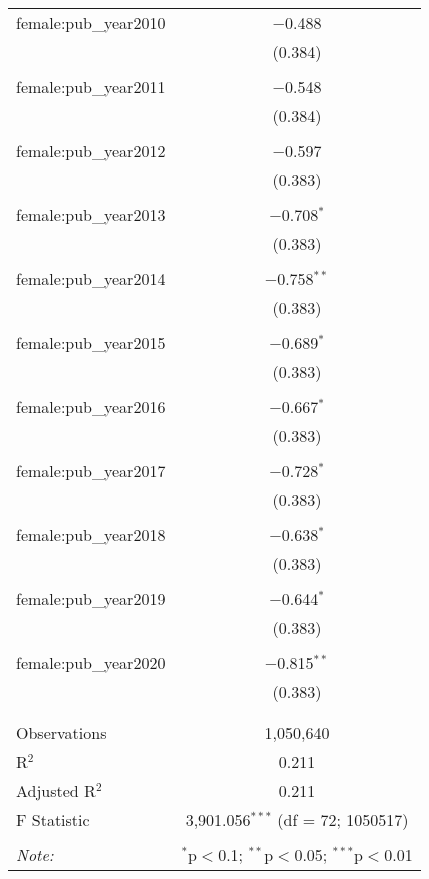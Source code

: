 \begin{table}[!htbp]
\begin{tabular}{@{\extracolsep{5pt}}lc}
 female:pub\_year2010 & $-$0.488 \\ 
  & (0.384) \\ 
  & \\ 
 female:pub\_year2011 & $-$0.548 \\ 
  & (0.384) \\ 
  & \\ 
 female:pub\_year2012 & $-$0.597 \\ 
  & (0.383) \\ 
  & \\ 
 female:pub\_year2013 & $-$0.708$^{*}$ \\ 
  & (0.383) \\ 
  & \\ 
 female:pub\_year2014 & $-$0.758$^{**}$ \\ 
  & (0.383) \\ 
  & \\ 
 female:pub\_year2015 & $-$0.689$^{*}$ \\ 
  & (0.383) \\ 
  & \\ 
 female:pub\_year2016 & $-$0.667$^{*}$ \\ 
  & (0.383) \\ 
  & \\ 
 female:pub\_year2017 & $-$0.728$^{*}$ \\ 
  & (0.383) \\ 
  & \\ 
 female:pub\_year2018 & $-$0.638$^{*}$ \\ 
  & (0.383) \\ 
  & \\ 
 female:pub\_year2019 & $-$0.644$^{*}$ \\ 
  & (0.383) \\ 
  & \\ 
 female:pub\_year2020 & $-$0.815$^{**}$ \\ 
  & (0.383) \\ 
  & \\ 
\hline \\[-1.8ex] 
Observations & 1,050,640 \\ 
R$^{2}$ & 0.211 \\ 
Adjusted R$^{2}$ & 0.211 \\ 
F Statistic & 3,901.056$^{***}$ (df = 72; 1050517) \\ 
\hline 
\hline \\[-1.8ex] 
\textit{Note:}  & \multicolumn{1}{r}{$^{*}$p$<$0.1; $^{**}$p$<$0.05; $^{***}$p$<$0.01} \\ 
\end{tabular} 
\end{table} 

